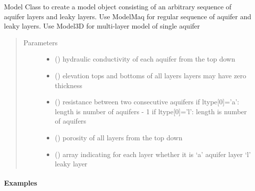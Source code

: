 \documentclass[letterpaper,10pt,english]{sphinxmanual}
\begin{document}
\begin{fulllineitems}
\label{\detokenize{models/model:timml.model.Model}}
Model Class to create a model object consisting of an arbitrary
sequence of aquifer layers and leaky layers.
Use ModelMaq for regular sequence of aquifer and leaky layers.
Use Model3D for multi-layer model of single aquifer
\begin{quote}\begin{description}
\item[{Parameters}] \leavevmode\begin{itemize}
\item {} 
 () \textendash{} hydraulic conductivity of each aquifer from the top down

\item {} 
 () \textendash{} elevation tops and bottoms of all layers
layers may have zero thickness

\item {} 
 () \textendash{} resistance between two consecutive aquifers
if ltype{[}0{]}=’a’: length is number of aquifers - 1
if ltype{[}0{]}=’l’: length is number of aquifers

\item {} 
 () \textendash{} porosity of all layers from the top down

\item {} 
 () \textendash{} array indicating for each layer whether it is
‘a’ aquifer layer
‘l’ leaky layer

\end{itemize}

\end{description}\end{quote}
\paragraph{Examples}


\end{fulllineitems}
\end{document}
